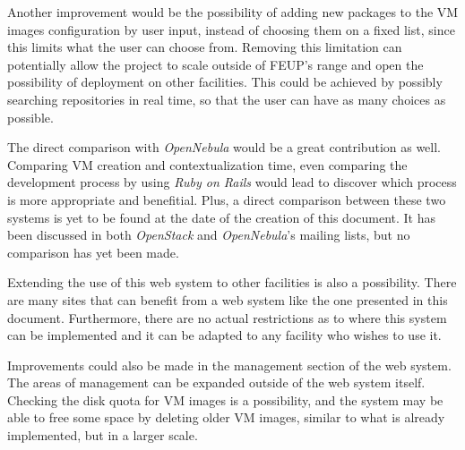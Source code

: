 Another improvement would be the possibility of adding new packages to the VM images configuration by user input, instead of choosing them on a fixed list, since this limits what the user can choose from. Removing this limitation can potentially allow the project to scale outside of FEUP's range and open the possibility of deployment on other facilities. This could be achieved by possibly searching repositories in real time, so that the user can have as many choices as possible.

The direct comparison with \textit{OpenNebula} would be a great contribution as well. Comparing VM creation and contextualization time, even comparing the development process by using \textit{Ruby on Rails} would lead to discover which process is more appropriate and benefitial.
Plus, a direct comparison between these two systems is yet to be found at the date of the creation of this document. It has been discussed in both \textit{OpenStack} and \textit{OpenNebula}'s mailing lists, but no comparison has yet been made.

Extending the use of this web system to other facilities is also a possibility. There are many sites that can benefit from a web system like the one presented in this document. Furthermore, there are no actual restrictions as to where this system can be implemented and it can be adapted to any facility who wishes to use it.

Improvements could also be made in the management section of the web system. The areas of management can be expanded outside of the web system itself. Checking the disk quota for VM images is a possibility, and the system may be able to free some space by deleting older VM images, similar to what is already implemented, but in a larger scale.
